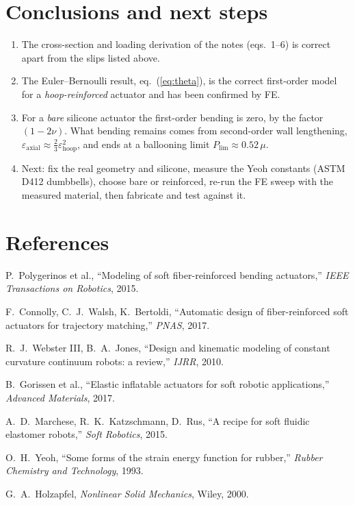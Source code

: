 \documentclass[11pt,a4paper]{article}
\numberwithin{equation}{section}
\begin{document}
\section{Conclusions and next steps}
\begin{enumerate}[nosep]
\item The cross-section and loading derivation of the notes (eqs.~1--6) is correct apart from the slips listed above.
\item The Euler--Bernoulli result, eq.~(\ref{eq:theta}), is the correct first-order model for a \emph{hoop-reinforced} actuator and has been confirmed by FE.
\item For a \emph{bare} silicone actuator the first-order bending is zero, by the factor $(1-2\nu)$. What bending remains comes from second-order wall lengthening, $\varepsilon_{\text{axial}}\approx\frac23\varepsilon_{\text{hoop}}^2$, and ends at a ballooning limit $P_{\text{lim}}\approx0.52\,\mu$.
\item Next: fix the real geometry and silicone, measure the Yeoh constants (ASTM D412 dumbbells), choose bare or reinforced, re-run the FE sweep with the measured material, then fabricate and test against it.
\end{enumerate}

\section*{References}
\small
\begin{enumerate}[label={[\arabic*]},nosep,leftmargin=2em]
\item P.~Polygerinos et al., ``Modeling of soft fiber-reinforced bending actuators,'' \emph{IEEE Transactions on Robotics}, 2015.
\item F.~Connolly, C.~J.~Walsh, K.~Bertoldi, ``Automatic design of fiber-reinforced soft actuators for trajectory matching,'' \emph{PNAS}, 2017.
\item R.~J.~Webster III, B.~A.~Jones, ``Design and kinematic modeling of constant curvature continuum robots: a review,'' \emph{IJRR}, 2010.
\item B.~Gorissen et al., ``Elastic inflatable actuators for soft robotic applications,'' \emph{Advanced Materials}, 2017.
\item A.~D.~Marchese, R.~K.~Katzschmann, D.~Rus, ``A recipe for soft fluidic elastomer robots,'' \emph{Soft Robotics}, 2015.
\item O.~H.~Yeoh, ``Some forms of the strain energy function for rubber,'' \emph{Rubber Chemistry and Technology}, 1993.
\item G.~A.~Holzapfel, \emph{Nonlinear Solid Mechanics}, Wiley, 2000.
\end{enumerate}
\end{document}

